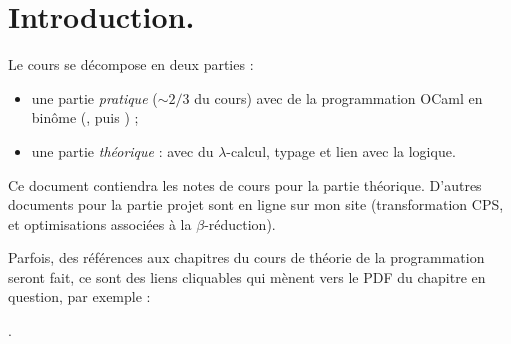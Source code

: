 \documentclass[./main]{subfiles}
\begin{document}
  \chapter*{Introduction.}

  Le cours se décompose en deux parties :
  \begin{itemize}
    \item une partie \textit{pratique} ($\sim 2/3$ du cours) avec de la programmation OCaml en binôme (\fouine, puis \pieuvre) ;
    \item une partie \textit{théorique} : avec du $\lambda$-calcul, typage et lien avec la logique.
  \end{itemize}

  Ce document contiendra les notes de cours pour la partie théorique.
  D'autres documents pour la partie projet sont en ligne sur mon site (transformation CPS, et optimisations associées à la $\beta$-réduction).

  Parfois, des références aux chapitres du cours de théorie de la programmation seront fait, ce sont des liens cliquables qui mènent vers le PDF du chapitre en question, par exemple :
  \begin{center}
    .
  \end{center}
\end{document}
